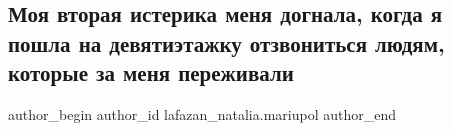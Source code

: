 
 
 
 
 

\subsection{Моя вторая истерика меня догнала, когда я пошла на девятиэтажку отзвониться людям, которые за меня переживали}
\label{sec:31_03_2022.fb.lafazan_natalia.mariupol.2.moja_vtoraja_isterika}

\ifcmt
 author_begin
   author_id lafazan_natalia.mariupol
 author_end
\fi

